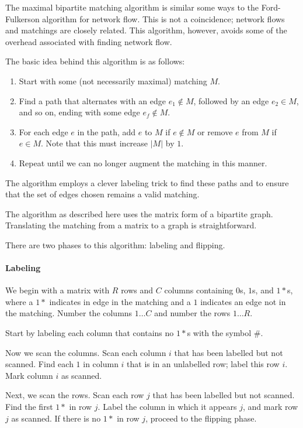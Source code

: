 \documentclass[12pt]{article}
\begin{document}
The maximal bipartite matching algorithm is similar some ways to the Ford-Fulkerson algorithm for network flow.  This is not a coincidence; network flows and matchings are closely related.  This algorithm, however, avoids some of the overhead associated with finding network flow.

The basic idea behind this algorithm is as follows:
\begin{enumerate}
\item Start with some (not necessarily maximal) matching $M$.
\item Find a path that alternates with an edge $e_1 \not\in M$, followed by an edge $e_2 \in M$, and so on, ending with some edge $e_f \not\in M$.
\item For each edge $e$ in the path, add $e$ to $M$ if $e \not\in M$ or remove $e$ from $M$ if $e \in M$.  Note that this must increase $|M|$ by $1$.
\item Repeat until we can no longer augment the matching in this manner.
\end{enumerate}

The algorithm employs a clever labeling trick to find these paths and to ensure that the set of edges chosen remains a valid matching.

The algorithm as described here uses the matrix form of a bipartite graph.  Translating the matching from a matrix to a graph is straightforward.

There are two phases to this algorithm: labeling and flipping.

\paragraph{Labeling}

We begin with a matrix with $R$ rows and $C$ columns containing $0$s, $1$s, and $1*$s, where a $1*$ indicates in edge in the matching and a $1$ indicates an edge not in the matching.  Number the columns $1 \dots C$ and number the rows $1 \dots R$.

Start by labeling each column that contains no $1*$s with the symbol $\#$.

Now we scan the columns.  Scan each column $i$ that has been labelled but not scanned.  Find each $1$ in column $i$ that is in an unlabelled row; label this row $i$.  Mark column $i$ as scanned.

Next, we scan the rows.  Scan each row $j$ that has been labelled but not scanned.  Find the first $1*$ in row $j$.  Label the column in which it appears $j$, and mark row $j$ as scanned.  If there is no $1*$ in row $j$, proceed to the flipping phase.
\end{document}
